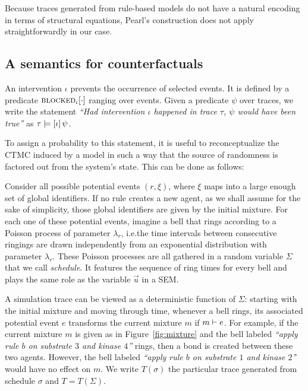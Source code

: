 Because traces generated from rule-based models do not have a natural
encoding in terms of structural equations, Pearl's construction does
not apply straightforwardly in our case.

\subsection{A semantics for counterfactuals}
\label{subsec:counterfactuals-semantics}

An intervention $\iota$ prevents the occurrence of selected events. It
is defined by a predicate ${\textsc{blocked}}_{\iota}[\cdot]$ ranging over
events. 
Given a predicate $\psi$ over traces, we write the statement
\textit{``Had intervention $\iota$ happened in trace $\tau$, $\psi$
  would have been true''} as $\tau \models [\iota] \, \psi{}$.

To assign a probability to this statement, it is useful to
reconceptualize the CTMC induced by a model in such a way that the
source of randomness is factored out from the system's state. This can
be done as follows:
\begin{inparaenum}[(i)]
\item Consider all possible potential events $(r, \xi)$, where $\xi$
  maps into a large enough set of global identifiers. If no rule
  creates a new agent, as we shall assume for the sake of simplicity,
  those global identifiers are given by the initial mixture. For each
  one of these potential events, imagine a bell that rings
 according to a Poisson process of parameter
  $\lambda_r$, i.e.\@ the time intervals between consecutive
  ringings are drawn independently from an exponential distribution with
  parameter $\lambda_r$. These Poisson processes are all gathered in
  a random variable $\Sigma$ that we call \emph{schedule}. It features
  the sequence of ring times for every bell and plays the same role as
  the variable $\vec{u}$ in a SEM.
\item A simulation trace can be viewed as a deterministic
  function of $\Sigma$: starting with the initial mixture and
  moving through time, whenever a bell rings, its associated potential
  event $e$ transforms the current mixture $m$ if
  $m \vdash e$. For example, if the current mixture $m$ is given as in 
  Figure~\ref{fig:mixture} and the bell labeled
  \textit{``apply rule $b$ on substrate $3$ and kinase $4$''} rings, then a bond is created
  between these two agents. However, the bell labeled
  \textit{``apply rule $b$ on substrate $1$ and kinase $2$'}' would have no effect 
  on $m$. We write $T(\sigma)$ the
  particular trace generated from schedule $\sigma$ and
  $T = T(\Sigma)$.
\end{inparaenum}


